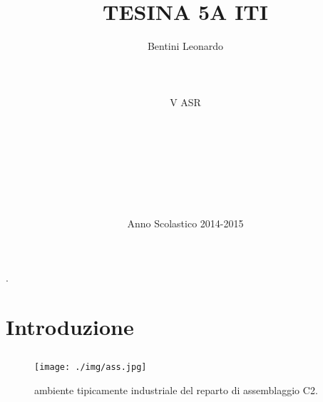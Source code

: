 \documentclass[a4paper,14pt,twoside]{extarticle} %
\title{\sf \textbf{TESINA 5A ITI\\}}
\author{Bentini Leonardo \\ \\ \\ \\ V ASR\\ \\ \\ \\ \\ \\ \\ \\}
\date{Anno Scolastico 2014-2015}
\begin{document}

\begin{titlepage}%
\setcounter{page}{0} %
\clearpage\maketitle
\thispagestyle{empty}
\newpage %

\newpage
\tiny.
\normalsize
\thispagestyle{empty}
\setcounter{page}{0}

\newpage
\clearpage\maketitle
\thispagestyle{empty}
\setcounter{page}{0}
\tableofcontents %
\end{titlepage}

\setlength{\headheight}{15pt}
\pagestyle{fancy}
\renewcommand{\sectionmark}[1]{\markboth{#1}{}} %
\fancyhf{}
\fancyhead[RE,LO]{\textbf \thepage}%
\fancyhead[RO]{\textit{ \small{\nouppercase{\leftmark}}} }%
\fancyhead[LE]{\textit{ \small{ \nouppercase{\leftmark}}} }
\newpage

\section{Introduzione}

\newpage

\subsection{}

\subsubsection{}
\begin{figure}[ht!]
\sf
\centering
\texttt{[image: ./img/ass.jpg]}
\caption{\small \sf \small ambiente tipicamente industriale del reparto di assemblaggio C2.}
\end{figure} 
\end{document}
